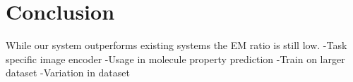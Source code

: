 \section{Conclusion}
While our system outperforms existing systems the EM ratio is still low. 
-Task specific image encoder
-Usage in molecule property prediction
-Train on larger dataset
-Variation in dataset